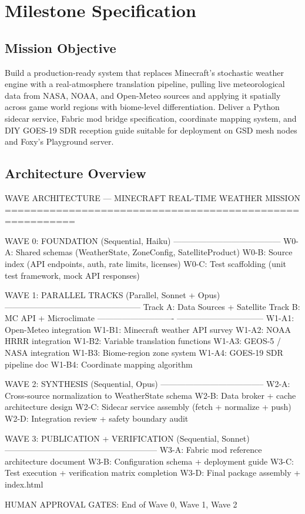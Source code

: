 \documentclass[11pt,letterpaper]{article}
\begin{document}
\section{Milestone Specification}

\subsection{Mission Objective}

Build a production-ready system that replaces Minecraft's stochastic weather engine with a real-atmosphere translation pipeline, pulling live meteorological data from NASA, NOAA, and Open-Meteo sources and applying it spatially across game world regions with biome-level differentiation. Deliver a Python sidecar service, Fabric mod bridge specification, coordinate mapping system, and DIY GOES-19 SDR reception guide suitable for deployment on GSD mesh nodes and Foxy's Playground server.

\subsection{Architecture Overview}

\begin{asciibox}
WAVE ARCHITECTURE — MINECRAFT REAL-TIME WEATHER MISSION
=========================================================

WAVE 0: FOUNDATION (Sequential, Haiku)
---------------------------------------
  W0-A: Shared schemas (WeatherState, ZoneConfig, SatelliteProduct)
  W0-B: Source index (API endpoints, auth, rate limits, licenses)
  W0-C: Test scaffolding (unit test framework, mock API responses)

WAVE 1: PARALLEL TRACKS (Parallel, Sonnet + Opus)
--------------------------------------------------
  Track A: Data Sources + Satellite    Track B: MC API + Microclimate
  ----------------------------         --------------------------------
  W1-A1: Open-Meteo integration        W1-B1: Minecraft weather API survey
  W1-A2: NOAA HRRR integration         W1-B2: Variable translation functions
  W1-A3: GEOS-5 / NASA integration     W1-B3: Biome-region zone system
  W1-A4: GOES-19 SDR pipeline doc      W1-B4: Coordinate mapping algorithm

WAVE 2: SYNTHESIS (Sequential, Opus)
--------------------------------------
  W2-A: Cross-source normalization to WeatherState schema
  W2-B: Data broker + cache architecture design
  W2-C: Sidecar service assembly (fetch + normalize + push)
  W2-D: Integration review + safety boundary audit

WAVE 3: PUBLICATION + VERIFICATION (Sequential, Sonnet)
--------------------------------------------------------
  W3-A: Fabric mod reference architecture document
  W3-B: Configuration schema + deployment guide
  W3-C: Test execution + verification matrix completion
  W3-D: Final package assembly + index.html

         HUMAN APPROVAL GATES: End of Wave 0, Wave 1, Wave 2
\end{asciibox}
\end{document}

